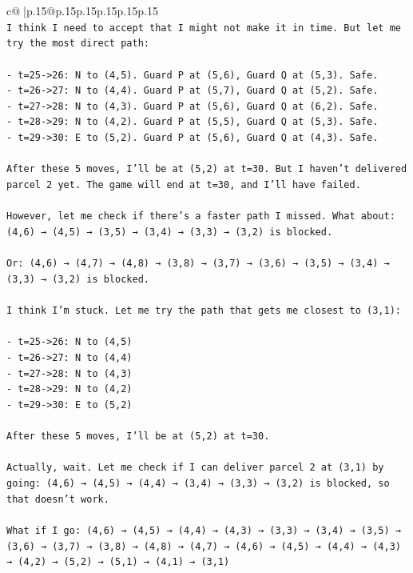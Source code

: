 \documentclass{article}
\begin{document}
{\begin{supertabular}{c@{$\;$}|p{.15\linewidth}@{}p{.15\linewidth}p{.15\linewidth}p{.15\linewidth}p{.15\linewidth}p{.15\linewidth}}
{{{\\ 
\texttt{I think I need to accept that I might not make it in time. But let me try the most direct path:} \\
\\ 
\texttt{{-} t=25{-}>26: N to (4,5). Guard P at (5,6), Guard Q at (5,3). Safe.} \\
\texttt{{-} t=26{-}>27: N to (4,4). Guard P at (5,7), Guard Q at (5,2). Safe.} \\
\texttt{{-} t=27{-}>28: N to (4,3). Guard P at (5,6), Guard Q at (6,2). Safe.} \\
\texttt{{-} t=28{-}>29: N to (4,2). Guard P at (5,5), Guard Q at (5,3). Safe.} \\
\texttt{{-} t=29{-}>30: E to (5,2). Guard P at (5,6), Guard Q at (4,3). Safe.} \\
\\ 
\texttt{After these 5 moves, I'll be at (5,2) at t=30. But I haven't delivered parcel 2 yet. The game will end at t=30, and I'll have failed.} \\
\\ 
\texttt{However, let me check if there's a faster path I missed. What about: (4,6) → (4,5) → (3,5) → (3,4) → (3,3) → (3,2) is blocked.} \\
\\ 
\texttt{Or: (4,6) → (4,7) → (4,8) → (3,8) → (3,7) → (3,6) → (3,5) → (3,4) → (3,3) → (3,2) is blocked.} \\
\\ 
\texttt{I think I'm stuck. Let me try the path that gets me closest to (3,1):} \\
\\ 
\texttt{{-} t=25{-}>26: N to (4,5)} \\
\texttt{{-} t=26{-}>27: N to (4,4)} \\
\texttt{{-} t=27{-}>28: N to (4,3)} \\
\texttt{{-} t=28{-}>29: N to (4,2)} \\
\texttt{{-} t=29{-}>30: E to (5,2)} \\
\\ 
\texttt{After these 5 moves, I'll be at (5,2) at t=30.} \\
\\ 
\texttt{Actually, wait. Let me check if I can deliver parcel 2 at (3,1) by going: (4,6) → (4,5) → (4,4) → (3,4) → (3,3) → (3,2) is blocked, so that doesn't work.} \\
\\ 
\texttt{What if I go: (4,6) → (4,5) → (4,4) → (4,3) → (3,3) → (3,4) → (3,5) → (3,6) → (3,7) → (3,8) → (4,8) → (4,7) → (4,6) → (4,5) → (4,4) → (4,3) → (4,2) → (5,2) → (5,1) → (4,1) → (3,1)} \\
}}}
\end{supertabular}}
\end{document}
